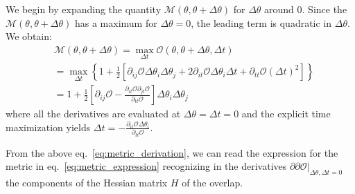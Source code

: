 \documentclass[twocolumn,showpacs,preprintnumbers,nofootinbib,prd,
superscriptaddress,10pt]{revtex4-1}
\begin{document}
We begin by expanding the quantity $\mathcal{M}(\theta,\theta +\Delta\theta)$ for $\Delta\theta$ around $0$. Since the $\mathcal{M}(\theta,\theta +\Delta\theta)$ has a maximum for $\Delta\theta = 0$, the leading term is quadratic in $\Delta\theta$.
We obtain:
\begin{align} \label{eq:metric_derivation}
	&\mathcal{M}(\theta,\theta +\Delta\theta) = \max_{\Delta t} \mathcal{O}(\theta, \theta + \Delta\theta, \Delta t) \nonumber\\
	& =	\max_{\Delta t} \left\{ 1+ \frac{1}{2}\left[ \partial_{ij}\mathcal{O} \Delta\theta_i \Delta\theta_j + 2  \partial_{it}\mathcal{O} \Delta\theta_i \Delta t + \partial_{tt}\mathcal{O} (\Delta t)^2 \right] \right\}  \nonumber \\
	&= 1 + \frac{1}{2}\left[ \partial_{ij}\mathcal{O} - \frac{\partial_{it}\mathcal{O} \partial_{jt}\mathcal{O}}{\partial_{tt}\mathcal{O}}\right] \Delta\theta_i \Delta\theta_j
\end{align}
where all the derivatives are evaluated at ${\Delta\theta = \Delta t = 0}$ and the explicit time maximization yields
${\Delta t = -\frac{\partial_{it}\mathcal{O} \Delta\theta_i}{\partial_{tt}\mathcal{O}}}$.

From the above eq.~\eqref{eq:metric_derivation}, we can read the expression for the metric in eq.~\eqref{eq:metric_expression} recognizing in the derivatives $\partial\partial\mathcal{O}|_{\Delta\theta, \Delta t = 0}$ the components of the Hessian matrix $H$ of the overlap.
\end{document}
